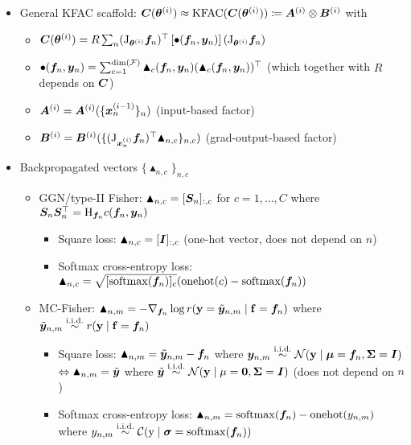 \begin{itemize}
  \item General KFAC scaffold: \qquad
    $
    {\bm{C}}({\bm{\theta}}^{(i)})
    \approx
    \mathrm{KFAC}({\bm{C}}({\bm{\theta}}^{(i)}))
    \coloneqq {\bm{A}}^{(i)} \otimes {\bm{B}}^{(i)}
    $
  \quad with
  \begin{itemize}
    \item ${\bm{C}}({\bm{\theta}}^{(i)})
    = R \sum_n
    (\mathrm{J}_{{\bm{\theta}}^{(i)}} {\bm{f}}_n)^{\top}
    \left[ \bullet({\bm{f}}_n, {\bm{y}}_n) \right]
    (\mathrm{J}_{{\bm{\theta}}^{(i)}} {\bm{f}}_n)$
    \item $\bullet({\bm{f}}_n, {\bm{y}}_n) = \sum_{c=1}^{\dim({\mathcal{F}})} \blacktriangle_c({\bm{f}}_n, {\bm{y}}_n) (\blacktriangle_c({\bm{f}}_n, {\bm{y}}_n))^{\top}$ \quad (which together with $R$ depends on ${\bm{C}}$)
    \item ${\bm{A}}^{(i)} = {\bm{A}}^{(i)}( \{{\bm{x}}_{n}^{(i-1)}\}_n )$ \quad (input-based factor)
    \item ${\bm{B}}^{(i)} = {\bm{B}}^{(i)}( \{ (\mathrm{J}_{{\bm{x}}_n^{(i)}}{\bm{f}}_{n})^{\top} \blacktriangle_{n,c}\}_{n,c})$ \quad (grad-output-based factor)
  \end{itemize}
  \item Backpropagated vectors $\{ \blacktriangle_{n,c} \}_{n,c}$
    \begin{itemize}
    \item GGN/type-II Fisher: $\blacktriangle_{n,c} = [{\bm{S}}_n]_{:,c}$ for $c = 1, \dots, C$ where ${\bm{S}}_n {\bm{S}}_n^{\top} = \mathrm{H}_{{\bm{f}}_n} c({\bm{f}}_n, {\bm{y}}_n)$
      \begin{itemize}
      \item Square loss: $\blacktriangle_{n,c} = [{\bm{I}}]_{:,c}$  (one-hot vector, does not depend on $n$)
      \item Softmax cross-entropy loss: $\blacktriangle_{n,c} =  \sqrt{[\mathrm{softmax}({\bm{f}}_n)]_c} (\mathrm{onehot}(c) - \mathrm{softmax}({\bm{f}}_n))$
      \end{itemize}

    \item MC-Fisher: $\blacktriangle_{n,m} = - \nabla_{{\bm{f}}_n} \log r({\mathbf{y}} = \tilde{{\bm{y}}}_{n,m} \mid {\mathbf{f}} = {\bm{f}}_n)$ where $\tilde{\vy}_{n,m} \stackrel{\text{\iid}}{\sim} r(\rvy \mid \rvf = \vf_n)$
      \begin{itemize}
      \item Square loss: $\blacktriangle_{n,m} = \tilde{{\bm{y}}}_{n,m} - {\bm{f}}_n$ where $\vy_{n,m} \stackrel{\text{\iid}}{\sim} \gN(\rvy \mid \vmu = \vf_n, \mSigma = \mI)$\\
        $\Leftrightarrow \blacktriangle_{n,m} = \tilde{{\bm{y}}}$ where $\tilde{\vy} \stackrel{\text{\iid}}{\sim} \gN(\rvy \mid \mu = \vzero, \mSigma = \mI)$ (does not depend on $n$)
        \item Softmax cross-entropy loss: $\blacktriangle_{n,m} = \mathrm{softmax}({\bm{f}}_n) - \mathrm{onehot}(y_{n,m})$ where $y_{n,m} \stackrel{\text{\iid}}{\sim} \gC(\ry \mid \vsigma = \softmax(\vf_n))$
      \end{itemize}


\end{itemize}
\end{itemize}
